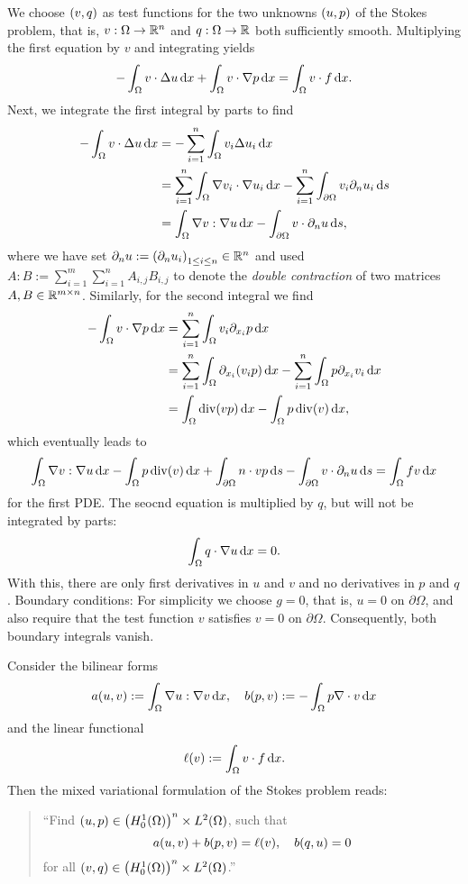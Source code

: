We choose \(\parentheses*{v, q}\) as test functions for the two unknowns \(\parentheses*{u, p}\) of the Stokes problem, that is, \(v: \Omega \to \R^n\) and \(q: \Omega \to \R\) both sufficiently smooth.
Multiplying the first equation by \(v\) and integrating yields
\[
	-\int_\Omega v \cdot \Delta u\d x + \int_\Omega v \cdot \nabla p\d x = \int_\Omega v \cdot f\d x.
\]
Next, we integrate the first integral by parts to find
\begin{align*}
	-\int_\Omega v \cdot \Delta u\d x &= -\sum_{i = 1}^n \int_\Omega v_i \Delta u_i \d x\\
	&= \sum_{i = 1}^n \int_\Omega \nabla v_i \cdot \nabla u_i\d x - \sum_{i = 1}^n \int_{\partial\Omega}v_i \partial_n u_i\d s\\
	&= \int_\Omega \nabla v : \nabla u\d x - \int_{\partial\Omega}v \cdot \partial_n u\d s,
\end{align*}
where we have set \(\partial_n u := \parentheses*{\partial_n u_i}_{1 \le i \le n} \in \R^n\) and used \(A : B := \sum_{i = 1}^m \sum_{i = 1}^n A_{i, j}B_{i, j}\) to denote the \emph{double contraction} of two matrices \(A, B \in \R^{m \times n}\).
Similarly, for the second integral we find
\begin{align*}
	-\int_\Omega v \cdot \nabla p\d x &= \sum_{i = 1}^n \int_\Omega v_i \partial_{x_i}p \d x\\
	&= \sum_{i = 1}^n \int_\Omega \partial_{x_i}\parentheses*{v_i p}\d x - \sum_{i = 1}^n \int_\Omega p \partial_{x_i} v_i\d x\\
	&= \int_\Omega \div\parentheses*{vp}\d x - \int_\Omega p\div\parentheses*{v}\d x,
\end{align*}
which eventually leads to
\[
	\int_\Omega \nabla v : \nabla u\d x - \int_\Omega p\div\parentheses*{v}\d x + \int_{\partial\Omega}n \cdot vp\d s - \int_{\partial\Omega}v \cdot \partial_n u\d s = \int_\Omega fv\d x
\]
for the first PDE.
The seocnd equation is multiplied by \(q\), but will not be integrated by parts:
\[
	\int_\Omega q \cdot \nabla u\d x = 0.
\]
With this, there are only first derivatives in \(u\) and \(v\) and no derivatives in \(p\) and \(q\).
Boundary conditions:
For simplicity we choose \(g = 0\), that is, \(u = 0\) on \(\partial\Omega\), and also require that the test function \(v\) satisfies \(v = 0\) on \(\partial\Omega\).
Consequently, both boundary integrals vanish.

\begin{definition}
	Consider the bilinear forms
	\[
		a\parentheses*{u, v} := \int_\Omega \nabla u : \nabla v\d x, \quad b\parentheses*{p, v} := -\int_\Omega p\nabla \cdot v\d x
	\]
	and the linear functional
	\[
		\ell\parentheses*{v} := \int_\Omega v \cdot f\d x.
	\]
	Then the mixed variational formulation of the Stokes problem reads:
	\begin{quote}
		``Find \(\parentheses*{u, p} \in \parentheses*{H_0^1\parentheses*{\Omega}}^n \times L^2\parentheses*{\Omega}\), such that
		\[
			a\parentheses*{u, v} + b\parentheses*{p, v} = \ell\parentheses*{v}, \quad b\parentheses*{q, u} = 0
		\]
		for all \(\parentheses*{v, q} \in \parentheses*{H_0^1\parentheses*{\Omega}}^n \times L^2\parentheses*{\Omega}\).''
	\end{quote}
\end{definition}

